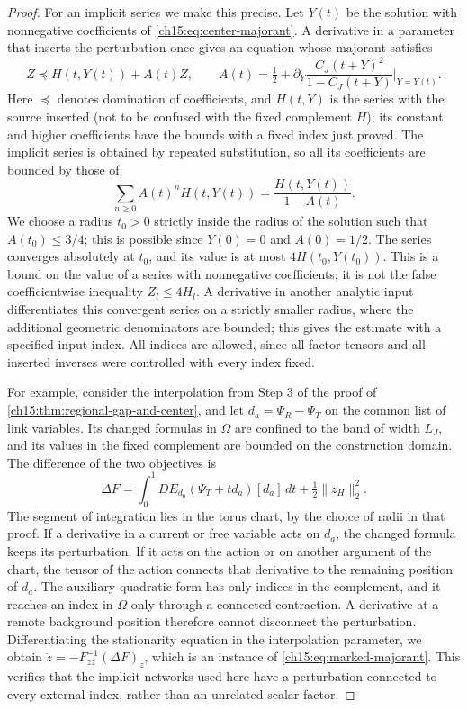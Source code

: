 \begin{proof}
For an implicit series we make this precise. Let $Y(t)$ be the solution with nonnegative coefficients of \eqref{ch15:eq:center-majorant}. A derivative in a parameter that inserts the perturbation once gives an equation whose majorant satisfies
\begin{equation}\label{ch15:eq:marked-majorant}
 Z\preceq H(t,Y(t))+A(t)Z,\qquad
 A(t)=\tfrac12+
 \partial_Y\frac{C_J(t+Y)^2}{1-C_J(t+Y)}\Big|_{Y=Y(t)} .
\end{equation}
Here $\preceq$ denotes domination of coefficients, and $H(t,Y)$ is the series with the source inserted (not to be confused with the fixed complement $H$); its constant and higher coefficients have the bounds with a fixed index just proved. The implicit series is obtained by repeated substitution, so all its coefficients are bounded by those of
\[
 \sum_{n\ge0}A(t)^nH(t,Y(t))
                =\frac{H(t,Y(t))}{1-A(t)} .
\]
We choose a radius $t_0>0$ strictly inside the radius of the solution such that $A(t_0)\le3/4$; this is possible since $Y(0)=0$ and $A(0)=1/2$. The series converges absolutely at $t_0$, and its value is at most $4H(t_0,Y(t_0))$. This is a bound on the value of a series with nonnegative coefficients; it is not the false coefficientwise inequality $Z_l\le4H_l$. A derivative in another analytic input differentiates this convergent series on a strictly smaller radius, where the additional geometric denominators are bounded; this gives the estimate with a specified input index. All indices are allowed, since all factor tensors and all inserted inverses were controlled with every index fixed.

For example, consider the interpolation from Step 3 of the proof of \cref{ch15:thm:regional-gap-and-center}, and let $d_a=\Psi_R-\Psi_T$ on the common list of link variables. Its changed formulas in $\Omega$ are confined to the band of width $L_J$, and its values in the fixed complement are bounded on the construction domain. The difference of the two objectives is
\begin{equation}\label{ch15:eq:marked-objective}
 \Delta F=\int_0^1
    DE_{d_0}(\Psi_T+t d_a)[d_a]\,dt+\tfrac12\|z_H\|_2^2 .
\end{equation}
The segment of integration lies in the torus chart, by the choice of radii in that proof. If a derivative in a current or free variable acts on $d_a$, the changed formula keeps its perturbation. If it acts on the action or on another argument of the chart, the tensor of the action connects that derivative to the remaining position of $d_a$. The auxiliary quadratic form has only indices in the complement, and it reaches an index in $\Omega$ only through a connected contraction. A derivative at a remote background position therefore cannot disconnect the perturbation. Differentiating the stationarity equation in the interpolation parameter, we obtain $\dot z=-F_{zz}^{-1}(\Delta F)_z$, which is an instance of \eqref{ch15:eq:marked-majorant}. This verifies that the implicit networks used here have a perturbation connected to every external index, rather than an unrelated scalar factor.


\end{proof}
